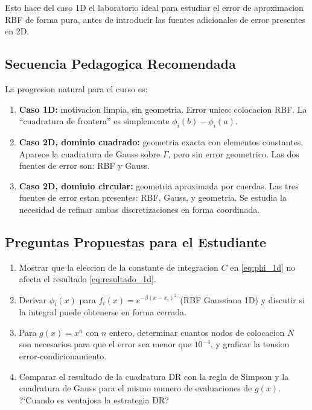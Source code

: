 \documentclass[12pt,a4paper]{article}
\begin{document}
Esto hace del caso 1D el laboratorio ideal para estudiar el error de
aproximacion RBF de forma pura, antes de introducir las fuentes adicionales
de error presentes en 2D.

\subsection{Secuencia Pedagogica Recomendada}

La progresion natural para el curso es:

\begin{enumerate}
    \item \textbf{Caso 1D:} motivacion limpia, sin geometria.
    Error unico: colocacion RBF. La ``cuadratura de frontera'' es
    simplemente $\phi_i(b) - \phi_i(a)$.

    \item \textbf{Caso 2D, dominio cuadrado:} geometria exacta con
    elementos constantes. Aparece la cuadratura de Gauss sobre $\Gamma$,
    pero sin error geometrico. Las dos fuentes de error son: RBF y Gauss.

    \item \textbf{Caso 2D, dominio circular:} geometria aproximada por
    cuerdas. Las tres fuentes de error estan presentes: RBF, Gauss, y
    geometria. Se estudia la necesidad de refinar ambas discretizaciones
    en forma coordinada.
\end{enumerate}

\subsection{Preguntas Propuestas para el Estudiante}

\begin{enumerate}
    \item Mostrar que la eleccion de la constante de integracion $C$
    en \eqref{eq:phi_1d} no afecta el resultado \eqref{eq:resultado_1d}.

    \item Derivar $\phi_i(x)$ para $f_i(x) = e^{-\beta(x-x_i)^2}$
    (RBF Gaussiana 1D) y discutir si la integral puede obtenerse en
    forma cerrada.

    \item Para $g(x) = x^n$ con $n$ entero, determinar cuantos nodos
    de colocacion $N$ son necesarios para que el error sea menor que
    $10^{-4}$, y graficar la tension error-condicionamiento.

    \item Comparar el resultado de la cuadratura DR con la regla de
    Simpson y la cuadratura de Gauss para el mismo numero de evaluaciones
    de $g(x)$. ?`Cuando es ventajosa la estrategia DR?
\end{enumerate}
\end{document}
